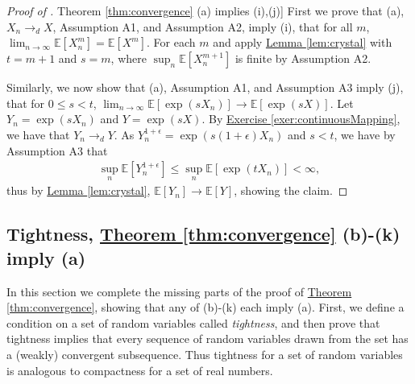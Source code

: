 \documentclass{article}
\theoremstyle{definition}
\newcommand{\E}{\mathbb E}
\newcommand{\1}{\mathbb I}
\newcommand{\thmhref}[1]{\hyperref[#1]{Theorem \ref{#1}}}
\newcommand{\lemhref}[1]{\hyperref[#1]{Lemma \ref{#1}}}
\newcommand{\exerhref}[1]{\hyperref[#1]{Exercise \ref{#1}}}
\begin{document}
\begin{proof}[Proof of \thmhref{thm:convergence} (a) implies (i),(j)]
  First we prove that (a), $X_n \to_d X$, Assumption A1, and
  Assumption A2, imply (i), that for all $m$, $\lim_{n \to \infty}
  \E[X_n^m] = \E[X^m]$.  For each $m$ and apply \lemhref{lem:crystal} with
  $t= m+1$ and $s = m$, where $\sup_n \E[X_{n}^{m+1}]$ is finite by
  Assumption A2.

  Similarly, we now show that (a), Assumption A1, and Assumption A3
  imply (j), that for $0 \leq s < t$, $\lim_{n \to \infty}
  \E[\exp(sX_n)] \to \E[\exp(sX)]$.  Let $Y_n = \exp(sX_n)$ and $Y =
  \exp(sX)$.  By \exerhref{exer:continuousMapping}, we have that $Y_n
  \to_d Y$.  As $Y_n^{1+\epsilon} = \exp(s(1+\epsilon)X_n)$ and $s < t$, we have by Assumption A3 that
  \begin{align*}
    \sup_n \E[Y_n^{1+\epsilon}] \leq \sup_n \E[\exp(tX_n)] < \infty,
  \end{align*}
  thus by \lemhref{lem:crystal}, $\E[Y_n] \to \E[Y]$, showing the claim.
\end{proof}

\subsection{Tightness, \thmhref{thm:convergence} (b)-(k) imply (a)}

In this section we complete the missing parts of the proof of
\thmhref{thm:convergence}, showing that any of (b)-(k) each imply (a).  First, we
define a condition on a set of random variables called
\emph{tightness}, and then prove that tightness implies that every
sequence of random variables drawn from the set has a (weakly)
convergent subsequence.  Thus tightness for a set of random variables
is analogous to compactness for a set of real numbers.
\end{document}
